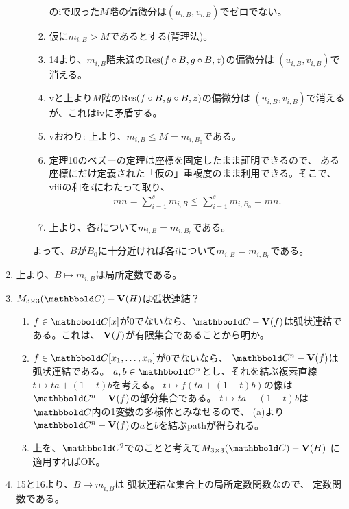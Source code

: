 \begin{myproof}
\begin{enumerate}
\begin{enumerate}
\begin{enumerate}
        のiで取った$M$階の偏微分は$(u_{i,B},v_{i,B})$でゼロでない。
        \item
        仮に$m_{i,B} > M$であるとする(背理法)。
        \item
        14より、$m_{i,B}$階未満の$\mathrm{Res}(f\circ B, g\circ B, z)$の偏微分は
        $(u_{i,B},v_{i,B})$で消える。
        \item
        vと上より$M$階の$\mathrm{Res}(f\circ B, g\circ B, z)$の偏微分は
        $(u_{i,B},v_{i,B})$で消えるが、これはivに矛盾する。
        \item
        vおわり: 上より、$m_{i,B}\le M = m_{i,B_0}$である。
        \item
        定理10のベズーの定理は座標を固定したまま証明できるので、
        ある座標にだけ定義された「仮の」重複度のまま利用できる。そこで、
        viiiの和を$i$にわたって取り、
        \begin{align}
          mn = \sum_{i=1}^s m_{i,B} \le \sum_{i=1}^s m_{i,B_0} = mn.
        \end{align}
        \item
        上より、各$i$について$m_{i,B} = m_{i,B_0}$である。
      \end{enumerate}
      よって、$B$が$B_0$に十分近ければ各$i$について$m_{i,B} = m_{i,B_0}$である。
    \end{enumerate}
    \item
    上より、$B\mapsto m_{i,B}$は局所定数である。
    \item
    $M_{3\times 3}(\C)-\var(H)$は弧状連結？
    \begin{enumerate}
      \item $f\in \C[x]$が0でないなら、$\C-\var(f)$は弧状連結である。これは、
      $\textbf V(f)$が有限集合であることから明か。
      \item $f\in \C[x_1,\dots,x_n]$が0でないなら、
      $\C^n - \var(f)$は弧状連結である。
      $a,b\in \C^n$とし、それを結ぶ複素直線$t\mapsto ta + (1-t)b$を考える。
      $t\mapsto f(ta+(1-t)b)$の像は$\C^n - \var(f)$の部分集合である。
      $t\mapsto ta+(1-t)b$は$\C$内の1変数の多様体とみなせるので、
      (a)より$\C^n - \var(f)$の$a$と$b$を結ぶpathが得られる。
      \item 上を、$\C^9$でのことと考えて$M_{3\times 3}(\C) - \var(H)$
      に適用すればOK。
    \end{enumerate}
    \item
    15と16より、$B\mapsto m_{i,B}$は
    弧状連結な集合上の局所定数関数なので、
    定数関数である。
  \end{enumerate}
\end{myproof}

